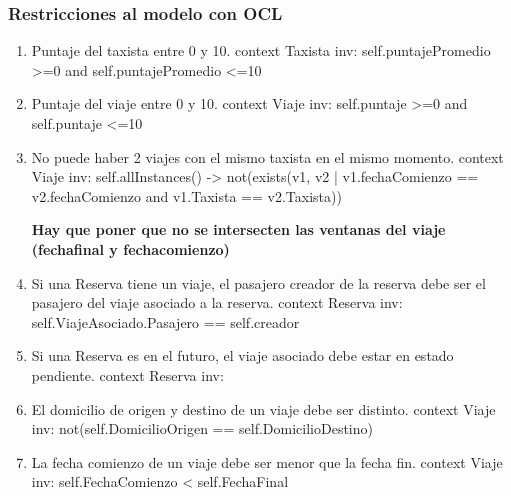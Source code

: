 \subsubsection{Restricciones al modelo con OCL}
\begin{enumerate}
	\item \begin{ocl}{Puntaje del taxista entre 0 y 10.}
		  context Taxista
		  inv: self.puntajePromedio >=0 and
		       self.puntajePromedio <=10
		\end{ocl}
	
	\item \begin{ocl}{Puntaje del viaje entre 0 y 10.}
		  context Viaje
		  inv: self.puntaje >=0 and
		       self.puntaje <=10
		\end{ocl}

	\item \begin{ocl}{No puede haber 2 viajes con el mismo taxista en el mismo momento.}
		  context Viaje
		  inv: self.allInstances() -> not(exists(v1, v2 | v1.fechaComienzo == v2.fechaComienzo 
		                                            and v1.Taxista == v2.Taxista))
		\end{ocl}
		\textbf{Hay que poner que no se intersecten las ventanas del viaje (fechafinal y fechacomienzo)}

	\item \begin{ocl}{Si una Reserva tiene un viaje, el pasajero creador de la reserva debe ser el pasajero del viaje asociado a la reserva.}
		  context Reserva
		  inv: self.ViajeAsociado.Pasajero == self.creador
		\end{ocl}

	\item \begin{ocl}{Si una Reserva es en el futuro, el viaje asociado debe estar en estado pendiente.}
		  context Reserva
		  inv: 
		\end{ocl}

	\item \begin{ocl}{El domicilio de origen y destino de un viaje debe ser distinto.}
		  context Viaje
		  inv: not(self.DomicilioOrigen == self.DomicilioDestino)
		\end{ocl}

	\item \begin{ocl}{La fecha comienzo de un viaje debe ser menor que la fecha fin.}
		  context Viaje
		  inv: self.FechaComienzo < self.FechaFinal
		\end{ocl}


\end{enumerate}
